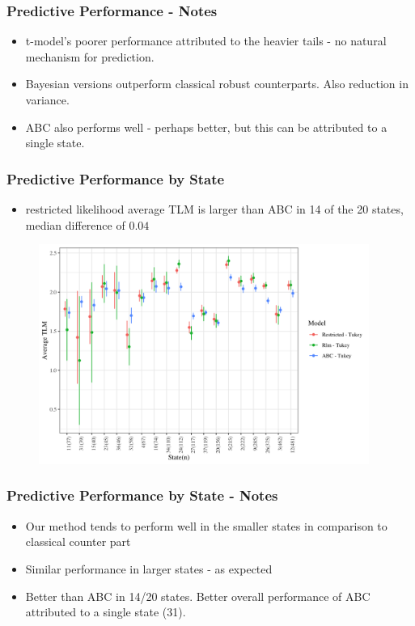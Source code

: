 \documentclass{beamer}
\begin{document}
\begin{frame}
	\frametitle{Predictive Performance - Notes}
\begin{itemize}
\item t-model's poorer performance attributed to the heavier tails - no natural mechanism for prediction. 
\item Bayesian versions outperform classical robust counterparts. Also reduction in variance. 
\item ABC also performs well - perhaps better, but this can be attributed to a single state. 
\end{itemize}
	
\end{frame}



\begin{frame}
	\frametitle{Predictive Performance by State}
\begin{itemize}
	\item restricted likelihood average TLM is larger than ABC in 14 of the 20 states, median difference of $0.04$
\end{itemize}
\begin{figure}[t]
	\centering
	\includegraphics[width=4.25in]{hier_ave_tlm_state.png}
	\label{fig:hierTLM}
\end{figure}

\end{frame}


\begin{frame}
	\frametitle{Predictive Performance by State - Notes}
\begin{itemize}
\item Our method tends to perform well in the smaller states in comparison to classical counter part
\item Similar performance in larger states - as expected
\item Better than ABC in 14/20 states. Better overall performance of ABC attributed to a single state (31). 

\end{itemize}
	
\end{frame}



%	
	
\end{document}
